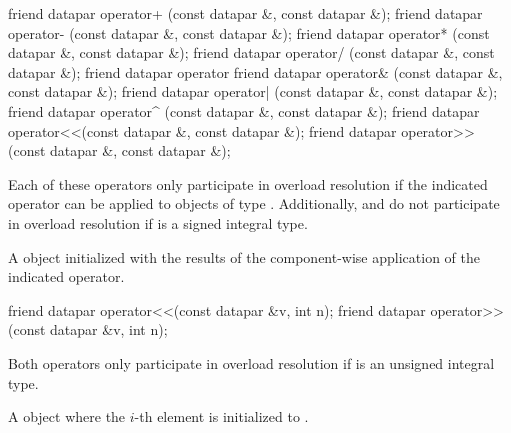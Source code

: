 
\begin{itemdecl}
friend datapar operator+ (const datapar &, const datapar &);
friend datapar operator- (const datapar &, const datapar &);
friend datapar operator* (const datapar &, const datapar &);
friend datapar operator/ (const datapar &, const datapar &);
friend datapar operator%
friend datapar operator& (const datapar &, const datapar &);
friend datapar operator| (const datapar &, const datapar &);
friend datapar operator^ (const datapar &, const datapar &);
friend datapar operator<<(const datapar &, const datapar &);
friend datapar operator>>(const datapar &, const datapar &);
\end{itemdecl}
\begin{itemdescr}
  \pnum\remarks Each of these operators only participate in overload resolution if the indicated operator can be applied to objects of type .
  Additionally,  and  do not participate in overload resolution if  is a signed integral type.

  \pnum\returns A \datapar object initialized with the results of the component-wise application of the indicated operator.
\end{itemdescr}

\begin{itemdecl}
friend datapar operator<<(const datapar &v, int n);
friend datapar operator>>(const datapar &v, int n);
\end{itemdecl}
\begin{itemdescr}
  \pnum\remarks Both operators only participate in overload resolution if  is an unsigned integral type.

  \pnum\returns A \datapar object where the $i$-th element is initialized to  \foralli.
\end{itemdescr}


